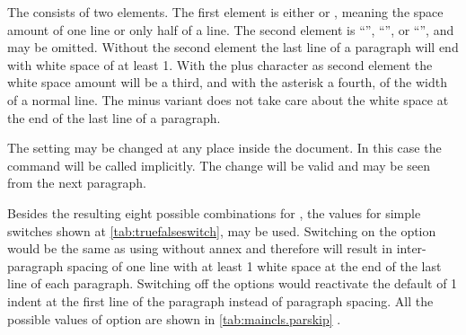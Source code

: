 \begin{Declaration}
\end{Declaration}
%

The  consists of two elements. The first element is either
 or , meaning the space amount of one line or only
half of a line. The second element is ``\PValue{*}'', ``\PValue{+}'', or
``\PValue{-}'', and may be omitted. Without the second element the last line
of a paragraph will end with white space of at least 1. With the plus
character as second element the white space amount will be a third, and with
the asterisk a fourth, of the width of a normal line. The minus variant does
not take care about the white space at the end of the last line of a
paragraph.

The setting may be changed at any place inside the document. In this case the
command %
will be called implicitly. The change will be valid and may be seen from the
next paragraph.

Besides the resulting eight possible combinations for , the values
for simple switches shown at \autoref{tab:truefalseswitch},
 may be used. Switching on the option would
be the same as using  without annex and therefore will result in
inter-paragraph spacing of one line with at least 1 white space at
the end of the last line of each paragraph. Switching off the options would
reactivate the default of 1 indent at the first line of the
paragraph instead of paragraph spacing. All the possible values of option
 are shown in \autoref{tab:maincls.parskip}%
%
.

